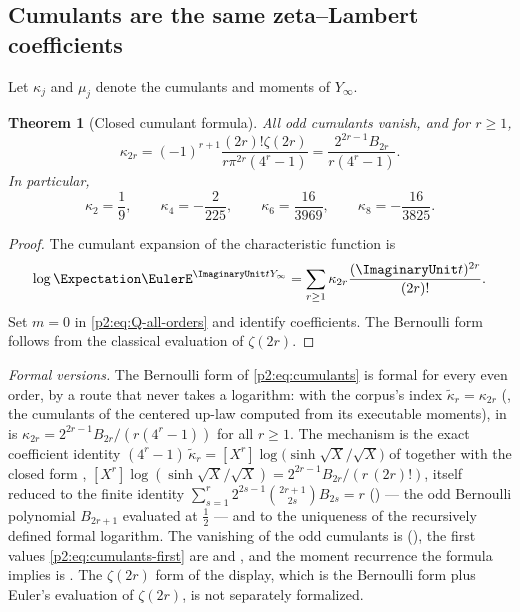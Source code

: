 \documentclass[11pt,oneside]{article}
\numberwithin{equation}{section}
\newtheorem{theorem}{Theorem}[section]
\theoremstyle{definition}
\theoremstyle{remark}
\begin{document}
\subsection{Cumulants are the same zeta--Lambert coefficients}

Let $\kappa_j$ and $\mu_j$ denote the cumulants and moments of $Y_\infty$.

\begin{theorem}[Closed cumulant formula]
\label{p2:thm:cumulants}
All odd cumulants vanish, and for $r\ge1$,
\begin{equation}
 \boxed{
 \kappa_{2r}
 =(-1)^{r+1}\frac{(2r)!\zeta(2r)}{r\pi^{2r}(4^r-1)}
 =\frac{2^{2r-1}B_{2r}}{r(4^r-1)}.}
 \label{p2:eq:cumulants}
\end{equation}
In particular,
\begin{equation}
 \kappa_2=\frac19,\qquad
 \kappa_4=-\frac2{225},\qquad
 \kappa_6=\frac{16}{3969},\qquad
 \kappa_8=-\frac{16}{3825}.
 \label{p2:eq:cumulants-first}
\end{equation}
\newresult
\end{theorem}

\begin{proof}
The cumulant expansion of the characteristic function is
\[
 \log\Expectation\EulerE^{\ImaginaryUnit tY_\infty}
 =\sum_{r\ge1}\kappa_{2r}\frac{(\ImaginaryUnit t)^{2r}}{(2r)!}.
\]
Set $m=0$ in \eqref{p2:eq:Q-all-orders} and identify coefficients.  The Bernoulli form follows
from the classical evaluation of $\zeta(2r)$.
\end{proof}

\emph{Formal versions.}  The Bernoulli form of \eqref{p2:eq:cumulants} is formal for every
even order, by a route that never takes a logarithm: with the corpus's index
$\tilde\kappa_r=\kappa_{2r}$ (, the cumulants
of the centered up-law computed from its executable moments),
 in
 is $\kappa_{2r}=2^{2r-1}B_{2r}/(r(4^r-1))$ for all $r\ge1$.
The mechanism is the exact coefficient identity
$(4^r-1)\,\tilde\kappa_r=[X^r]\log\bigl(\sinh\sqrt X/\sqrt X\bigr)$ of
 together with the closed form
,
$[X^r]\log(\sinh\sqrt X/\sqrt X)=2^{2r-1}B_{2r}/(r\,(2r)!)$, itself reduced to the finite
identity $\sum_{s=1}^{r}2^{2s-1}\binom{2r+1}{2s}B_{2s}=r$
() --- the odd Bernoulli polynomial
$B_{2r+1}$ evaluated at $\tfrac12$ --- and to the uniqueness of the recursively defined formal
logarithm.  The vanishing of the odd cumulants is
(), the first values \eqref{p2:eq:cumulants-first} are
 and
, and the moment recurrence the formula
implies is .  The $\zeta(2r)$ form of
the display, which is the Bernoulli form plus Euler's evaluation of $\zeta(2r)$, is not
separately formalized.
\end{document}
